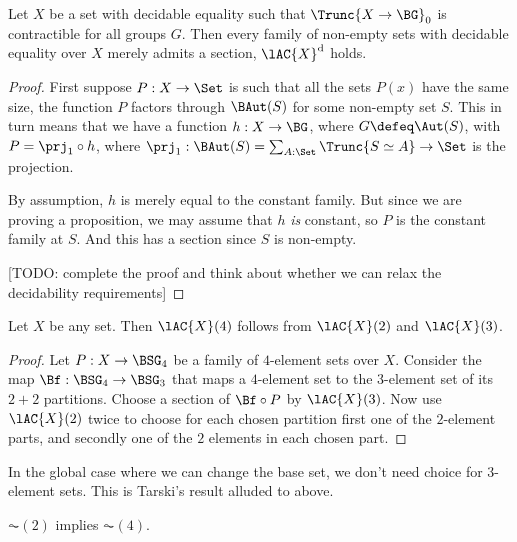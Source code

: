 \begin{theorem}[Blass]\label{thm:Blass}
  Let $X$ be a set with decidable equality such that $\Trunc{X \to \BG}_0$ is contractible
  for all groups $G$.
  Then every family of non-empty sets with decidable equality over $X$
  merely admits a section,
  \ie $\lAC{X}^{\mathrm{d}}$ holds.
\end{theorem}

\begin{proof}
  First suppose $P : X \to \Set$ is such that all the sets $P(x)$
  have the same size, \ie the function $P$ factors through
  $\BAut(S)$ for some non-empty set $S$.
  This in turn means that we have a function $h : X \to \BG$,
  where $G \defeq \Aut(S)$, with $P = \prj_1 \circ h$,
  where $\prj_1 : \BAut(S) = \sum_{A : \Set}\Trunc{S \simeq A} \to \Set$
  is the projection.

  By assumption, $h$ is merely equal to the constant family.
  But since we are proving a proposition, we may assume that $h$
  \emph{is} constant, so $P$ is the constant family at $S$.
  And this has a section since $S$ is non-empty.

  [TODO: complete the proof and think about whether we can relax the
  decidability requirements]
\end{proof}

\begin{theorem}
  Let $X$ be any set. Then $\lAC{X}(4)$ follows from $\lAC{X}(2)$ and $\lAC{X}(3)$.
\end{theorem}

\begin{proof}
  Let $P : X \to \BSG_4$ be a family of $4$-element sets over $X$.
  Consider the map $\Bf : \BSG_4 \to \BSG_3$ that maps a $4$-element set
  to the $3$-element set of its $2+2$ partitions.
  Choose a section of $\Bf \circ P$ by $\lAC{X}(3)$.
  Now use $\lAC{X}(2)$ twice to choose for each chosen partition
  first one of the $2$-element parts, and secondly one of the $2$
  elements in each chosen part.
\end{proof}

In the global case where we can change the base set,
we don't need choice for $3$-element sets.
This is Tarski's result alluded to above.

\begin{theorem}
  $\AC(2)$ implies $\AC(4)$.
\end{theorem}

